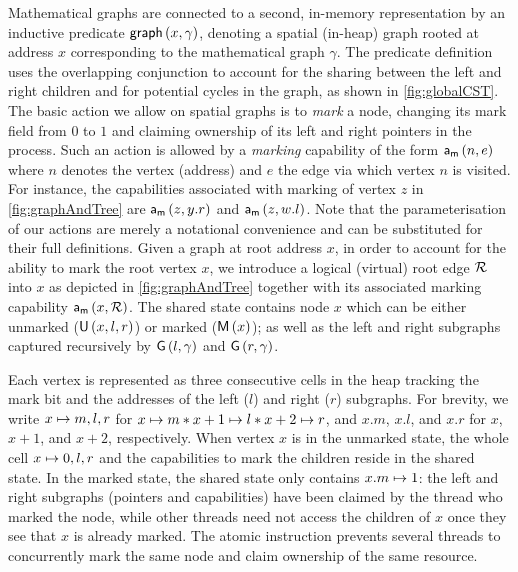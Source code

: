 Mathematical graphs are connected to a second, in-memory
representation by an inductive predicate $\textsf{graph}\left(x, \gamma\right)$, denoting
a spatial (in-heap) graph rooted at address $x$ corresponding to the
mathematical graph $\gamma$. The predicate definition uses the
overlapping conjunction to account for the sharing between the left
and right children and for potential cycles in the graph, as shown in
\fig\ref{fig:globalCST}.  The basic action we allow on spatial graphs
is to \emph{mark} a node, changing its mark field from $0$ to $1$ and
claiming ownership of its left and right pointers in the process. Such
an action is allowed by a \emph{marking} capability of the form
$\mathsf{a}_{\textsf{m}}\left(n, e\right)$ where $n$ denotes the vertex (address) and $e$ the edge
via which vertex $n$ is visited. For instance, the capabilities
associated with marking of vertex $z$ in \fig\ref{fig:graphAndTree}
are $\mathsf{a}_{\textsf{m}}\left(z, y.r\right)$ and $\mathsf{a}_{\textsf{m}}\left(z, w.l\right)$. Note that the
parameterisation of our actions are merely a notational convenience
and can be substituted for their full definitions. Given a graph at
root address $x$, in order to account for the ability to mark the root
vertex $x$, we introduce a logical (virtual) root edge $\mathcal{R}$
into $x$ as depicted in \fig\ref{fig:graphAndTree} together with its
associated marking capability $\mathsf{a}_{\textsf{m}}\left(x, \mathcal{R}\right)$. The shared state
contains node $x$ which can be either unmarked ($\textsf{U}\left(x, l, r\right)$)
or marked ($\textsf{M}\left(x\right)$); as well as the left and right subgraphs
captured recursively by $\textsf{G}\left(l, \gamma\right)$ and $\textsf{G}\left(r, \gamma\right)$.

Each vertex is represented as three consecutive cells in the heap
tracking the mark bit and the addresses of the left ($l$) and right
($r$) subgraphs. For brevity, we write $x \mapsto m, l, r$ for
$x \mapsto m * x+1 \mapsto l * x+2 \mapsto r$, and $x.m$, $x.l$, and
$x.r$ for $x$, $x+1$, and $x+2$, respectively. When vertex $x$ is in
the unmarked state, the whole cell $x \mapsto 0,l,r$ and the
capabilities to mark the children reside in the shared state. In the
marked state, the shared state only contains $x.m \mapsto 1$: the left
and right subgraphs (pointers and capabilities) have been claimed by
the thread who marked the node, while other threads need not access
the children of $x$ once they see that $x$ is already marked. The
atomic  instruction prevents several threads to concurrently
mark the same node and claim ownership of the same resource.


